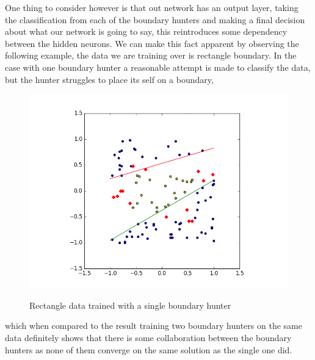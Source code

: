 \documentclass[notitlepage]{report}
\theoremstyle{definition}
\begin{document}
One thing to consider however is that out network has an output layer, taking the classification from each of the boundary hunters and making a final decision about what our network is going to say, this reintroduces some dependency between the hidden neurons. We can make this fact apparent by observing the following example, the data we are training over is rectangle boundary. In the case with one boundary hunter a reasonable attempt is made to classify the data, but the hunter struggles to place its self on a boundary,

\begin{figure}[H]
  \centering
  \begin{minipage}[b]{0.8\textwidth}
    \includegraphics[width=\textwidth]{RecData-1HP.png}
    \caption{}
  \end{minipage}
  \hfill

Rectangle data trained with a single boundary hunter
\end{figure}

which when compared to the result training two boundary hunters on the same data definitely shows that there is some collaboration between the boundary hunters as none of them converge on the same solution as the single one did.
\end{document}
